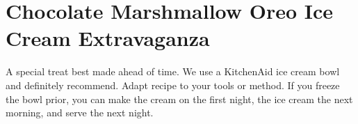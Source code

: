 \section[Chocolate Oreo]{
    Chocolate Marshmallow Oreo Ice Cream Extravaganza
}

\begin{recipestats}[
        servings=5 $C$,
        preptime=10 \minute,
        bakingtime=30 \minute,
        inactivetime=24 \hour,
        source=Mike \& Jane,
        original=\citefield{joyofcooking2006}{title}~\cite{joyofcooking2006},
    ]
\end{recipestats}

\begin{recipeabstract}
    A special treat best made ahead of time.
    We use a KitchenAid ice cream bowl and definitely recommend.
    Adapt recipe to your tools or method.
    If you freeze the bowl prior, you can make the cream on the first night, the ice cream the next morning,
    and serve the next night.
\end{recipeabstract}

\begin{ingredientcolumns}
    \begin{ingredientblock}
        \\
        \\
        \\
        \\
    \end{ingredientblock}
    \begin{ingredientblock}
        \\
        \\
        \\
        \\
    \end{ingredientblock}
\end{ingredientcolumns}

